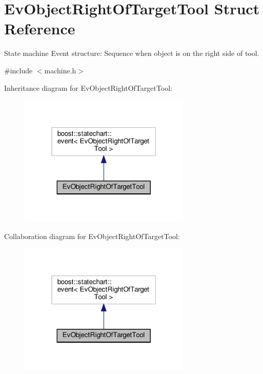 \hypertarget{structEvObjectRightOfTargetTool}{}\section{Ev\+Object\+Right\+Of\+Target\+Tool Struct Reference}
\label{structEvObjectRightOfTargetTool}


State machine Event structure\+: Sequence when object is on the right side of tool.  




{\ttfamily \#include $<$machine.\+h$>$}



Inheritance diagram for Ev\+Object\+Right\+Of\+Target\+Tool\+:
\nopagebreak
\begin{figure}[H]
\begin{center}
\leavevmode
\includegraphics[width=232pt]{structEvObjectRightOfTargetTool__inherit__graph}
\end{center}
\end{figure}


Collaboration diagram for Ev\+Object\+Right\+Of\+Target\+Tool\+:
\nopagebreak
\begin{figure}[H]
\begin{center}
\leavevmode
\includegraphics[width=232pt]{structEvObjectRightOfTargetTool__coll__graph}
\end{center}
\end{figure}


